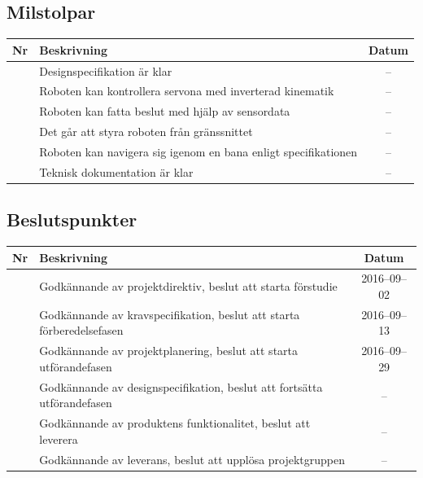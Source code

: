 \documentclass[a4paper,titlepage,12pt]{article}
\newcounter{milNr}
\newcommand{\nextMilNr}{\stepcounter{milNr}\arabic{milNr}}
\newcounter{bpNr}
\newcommand{\nextBPNr}{\stepcounter{bpNr}\arabic{bpNr}}
\begin{document}
	\subsection{Milstolpar}
	\begin{longtable}[c]{ c l c}
		\textbf{Nr} & \textbf{Beskrivning} & \textbf{Datum} \\ \midrule
		\nextMilNr{} & Designspecifikation är klar & -- \\ \midrule
		\nextMilNr{} & Roboten kan kontrollera servona med inverterad kinematik & -- \\ \midrule
		\nextMilNr{} & Roboten kan fatta beslut med hjälp av sensordata & -- \\ \midrule
		\nextMilNr{} & Det går att styra roboten från gränssnittet & -- \\ \midrule
		\nextMilNr{} & Roboten kan navigera sig igenom en bana enligt specifikationen& -- \\ \midrule
		\nextMilNr{} & Teknisk dokumentation är klar & -- \\ \midrule
	\end{longtable}
	
	
	\subsection{Beslutspunkter}
	\renewcommand*{\arraystretch}{1.4}
	\begin{longtable}[c]{ c l c}
		\textbf{Nr} & \textbf{Beskrivning} & \textbf{Datum} \\ \midrule
		\nextBPNr{} & Godkännande av projektdirektiv, beslut att starta förstudie & 2016--09--02 \\ \midrule
		\nextBPNr{} & Godkännande av kravspecifikation, beslut att starta förberedelsefasen & 2016--09--13 \\ \midrule
		\nextBPNr{} & Godkännande av projektplanering, beslut att starta utförandefasen & 2016--09--29 \\ \midrule
		\nextBPNr{} & Godkännande av designspecifikation, beslut att fortsätta
		utförandefasen & -- \\ \midrule
		\nextBPNr{} & Godkännande av produktens funktionalitet, beslut att leverera & -- \\ \midrule
		\nextBPNr{} & Godkännande av leverans, beslut att upplösa projektgruppen & -- \\ \midrule
	\end{longtable}
	
	
\end{document}
